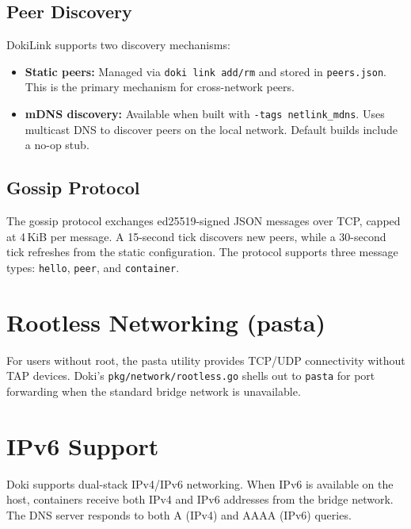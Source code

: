 \subsection{Peer Discovery}
\label{sec:peer-discovery}

DokiLink supports two discovery mechanisms:

\begin{itemize}[leftmargin=*, itemsep=3pt]
  \item \textbf{Static peers:} Managed via \texttt{doki link add/rm}
        and stored in \texttt{peers.json}. This is the primary
        mechanism for cross-network peers.

  \item \textbf{mDNS discovery:} Available when built with
        \texttt{-tags netlink\_mdns}. Uses multicast DNS to discover
        peers on the local network. Default builds include a no-op
        stub.
\end{itemize}

\subsection{Gossip Protocol}
\label{sec:gossip}

The gossip protocol exchanges ed25519-signed JSON messages over TCP,
capped at 4\,KiB per message. A 15-second tick discovers new peers,
while a 30-second tick refreshes from the static configuration. The
protocol supports three message types: \texttt{hello}, \texttt{peer},
and \texttt{container}.

\section{Rootless Networking (pasta)}
\label{sec:pasta}

For users without root, the pasta utility provides TCP/UDP connectivity
without TAP devices. Doki's \texttt{pkg/network/rootless.go} shells
out to \texttt{pasta} for port forwarding when the standard bridge
network is unavailable.

\section{IPv6 Support}
\label{sec:ipv6}

Doki supports dual-stack IPv4/IPv6 networking. When IPv6 is available
on the host, containers receive both IPv4 and IPv6 addresses from
the bridge network. The DNS server responds to both A (IPv4) and
AAAA (IPv6) queries.


